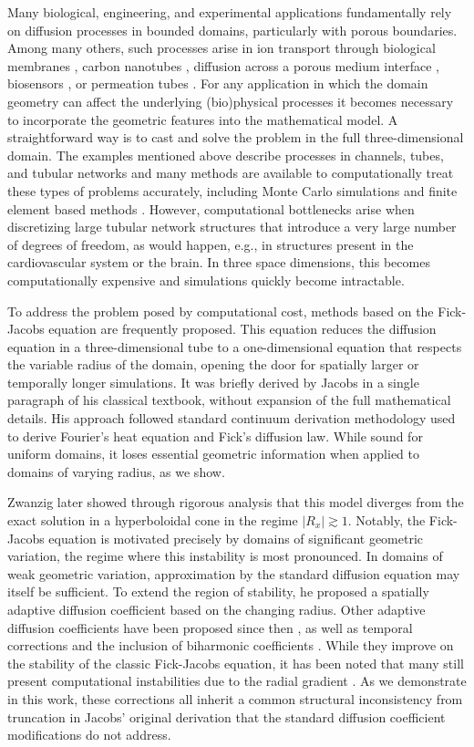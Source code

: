 \documentclass[11pt]{article}
\begin{document}
 Many biological, engineering, and experimental applications fundamentally rely on diffusion processes in bounded domains, particularly with porous boundaries. Among many others, such processes arise in ion transport through biological membranes \cite{Hille2001,YKA1991}, carbon nanotubes \cite{BH2002}, diffusion across a porous medium interface \cite{ARDIR2014}, biosensors \cite{Keyser2006}, or permeation tubes \cite{Lucero1971}. For any application in which the domain geometry can affect the underlying (bio)physical processes it becomes necessary to incorporate the geometric features into the mathematical model. A straightforward way is to cast and solve the problem in the full three-dimensional domain. 
 The examples mentioned above describe processes in channels, tubes, and tubular networks and many methods are available to computationally treat these types of problems accurately, including Monte Carlo simulations \cite{SLK2012} and finite element based methods \cite{GQ2022}. However, computational bottlenecks arise when discretizing large tubular network structures that introduce a very large number of degrees of freedom, as would happen, e.g., in structures present in the cardiovascular system or the brain. In three space dimensions, this becomes computationally expensive and simulations quickly become intractable. 

To address the problem posed by computational cost, methods based on the Fick-Jacobs equation \cite{Jacobs1935} are frequently proposed. This equation reduces the diffusion equation in a three-dimensional tube to a one-dimensional equation that respects the variable radius of the domain, opening the door for spatially larger or temporally longer simulations. It was briefly derived by Jacobs in a single paragraph of his classical textbook, without expansion of the full mathematical details. His approach followed standard continuum derivation methodology used to derive Fourier's heat equation and Fick's diffusion law. While sound for uniform domains, it loses essential geometric information when applied to domains of varying radius, as we show. 

Zwanzig later showed through rigorous analysis \cite{Zwanzig1992} that this model diverges from the exact solution in a hyperboloidal cone in the regime $|R_x| \gtrsim 1$. Notably, the Fick-Jacobs equation is motivated precisely by domains of significant geometric variation, the regime where this instability is most pronounced. In domains of weak geometric variation, approximation by the standard diffusion equation may itself be sufficient. To extend the region of stability, he proposed a spatially adaptive diffusion coefficient based on the changing radius. Other adaptive diffusion coefficients have been proposed since then \cite{RR01, KP06}, as well as temporal corrections \cite{Kalinay2013} and the inclusion of biharmonic coefficients \cite{CLG2023}. While they improve on the stability of the classic Fick-Jacobs equation, it has been noted that many still present computational instabilities due to the radial gradient \cite{BPB2007}. As we demonstrate in this work, these corrections all inherit a common structural inconsistency from truncation in Jacobs' original derivation that the standard diffusion coefficient modifications do not address.
\end{document}
